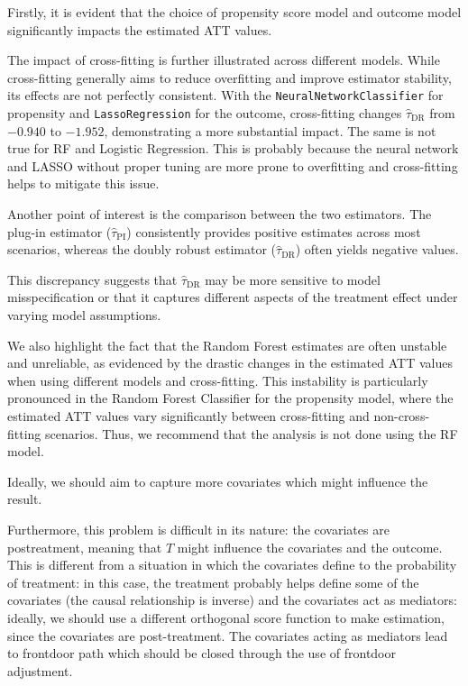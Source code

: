 \documentclass{article}
\begin{document}
Firstly, it is evident that the choice of propensity score model and outcome model significantly impacts the estimated ATT values. 

The impact of cross-fitting is further illustrated across different models. While cross-fitting generally aims to reduce overfitting and improve estimator stability, its effects are not perfectly consistent. With the \texttt{NeuralNetworkClassifier} for propensity and \texttt{LassoRegression} for the outcome, cross-fitting changes $\hat{\tau}_{\text{DR}}$ from $-0.940$ to $-1.952$, demonstrating a more substantial impact. The same is not true for RF and Logistic Regression. This is probably because the neural network and LASSO without proper tuning are more prone to overfitting and cross-fitting helps to mitigate this issue.

Another point of interest is the comparison between the two estimators. The plug-in estimator ($\hat{\tau}_{\text{PI}}$) consistently provides positive estimates across most scenarios, whereas the doubly robust estimator ($\hat{\tau}_{\text{DR}}$) often yields negative values.

This discrepancy suggests that $\hat{\tau}_{\text{DR}}$ may be more sensitive to model misspecification or that it captures different aspects of the treatment effect under varying model assumptions.

We also highlight the fact that the Random Forest estimates are often unstable and unreliable, as evidenced by the drastic changes in the estimated ATT values when using different models and cross-fitting. This instability is particularly pronounced in the Random Forest Classifier for the propensity model, where the estimated ATT values vary significantly between cross-fitting and non-cross-fitting scenarios. Thus, we recommend that the analysis is not done using the RF model.

Ideally, we should aim to capture more covariates which might influence the result.

Furthermore, this problem is difficult in its nature: the covariates are postreatment, meaning that $T$ might influence the covariates and the outcome. This is different from a situation in which the covariates define to the probability of treatment: in this case, the treatment probably helps define some of the covariates (the causal relationship is inverse) and the covariates act as mediators: ideally, we should use a different orthogonal score function to make estimation, since the covariates are post-treatment. The covariates acting as mediators lead to frontdoor path which should be closed through the use of frontdoor adjustment.
\end{document}
